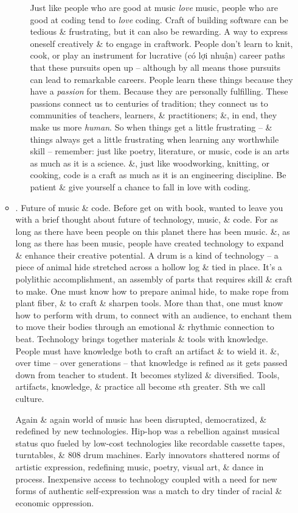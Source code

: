 \documentclass{article}
\begin{document}
\begin{itemize}
\begin{itemize}
\begin{itemize}
			Just like people who are good at music {\it love} music, people who are good at coding tend to {\it love} coding. Craft of building software can be tedious \& frustrating, but it can also be rewarding. A way to express oneself creatively \& to engage in craftwork. People don't learn to knit, cook, or play an instrument for lucrative (có lợi nhuận) career paths that these pursuits open up -- although by all means those pursuits can lead to remarkable careers. People learn these things because they have a {\it passion} for them. Because they are personally fulfilling. These passions connect us to centuries of tradition; they connect us to communities of teachers, learners, \& practitioners; \&, in end, they make us more {\it human}. So when things get a little frustrating -- \& things always get a little frustrating when learning any worthwhile skill -- remember: just like poetry, literature, or music, code is an arts as much as it is a science. \&, just like woodworking, knitting, or cooking, code is a craft as much as it is an engineering discipline. Be patient \& give yourself a chance to fall in love with coding.
		\end{itemize}
		\item {. Future of music \& code.} Before get on with book, wanted to leave you with a brief thought about future of technology, music, \& code. For as long as there have been people on this planet there has been music. \&, as long as there has been music, people have created technology to expand \& enhance their creative potential. A drum is a kind of technology -- a piece of animal hide stretched across a hollow log \& tied in place. It's a polylithic accomplishment, an assembly of parts that requires skill \& craft to make. One must know how to prepare animal hide, to make rope from plant fiber, \& to craft \& sharpen tools. More than that, one must know how to perform with drum, to connect with an audience, to enchant them to move their bodies through an emotional \& rhythmic connection to beat. Technology brings together materials \& tools with knowledge. People must have knowledge both to craft an artifact \& to wield it. \&, over time -- over generations -- that knowledge is refined as it gets passed down from teacher to student. It becomes stylized \& diversified. Tools, artifacts, knowledge, \& practice all become sth greater. Sth we call culture.
		
		Again \& again world of music has been disrupted, democratized, \& redefined by new technologies. Hip-hop was a rebellion against musical status quo fueled by low-cost technologies like recordable cassette tapes, turntables, \& 808 drum machines. Early innovators shattered norms of artistic expression, redefining music, poetry, visual art, \& dance in process. Inexpensive access to technology coupled with a need for new forms of authentic self-expression was a match to dry tinder of racial \& economic oppression.
		

\end{itemize}
\end{itemize}
\end{document}
